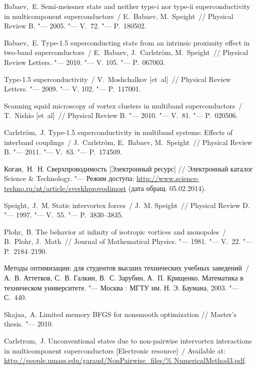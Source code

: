 \begin{thebibliography}{10}
     Babaev,~E. Semi-meissner state and neither type-i nor 
        type-ii superconductivity in multicomponent superconductors~/ 
        E.~Babaev, M.~Speight~// Physical Review B. "--- 2005. "---
        V.~72. "--- P.~180502.

     Babaev,~E. Type-1.5 superconducting state from an 
        intrinsic proximity effect in two-band superconductors~/ 
        E.~Babaev, J.~Carlstr\"om, M.~Speight~// Physical Review Letters. "---
        2010. "--- V. 105. "--- P.~067003.

     Type-1.5 superconductivity~/ V.~Moshchalkov [et~al]~// 
        Physical Review Letters. "--- 2009. "--- V. 102. "--- P.~117001.

     Scanning squid microscopy of vortex clusters in multiband 
        superconductors~/ T.~Nishio [et~al]~// Physical Review B. "---
        2010. "--- V.~81. "--- P.~020506.

     Carlstr\"om,~J. Type-1.5 superconductivity in multiband 
        systems: Effects of interband couplings~/ J.~Carlstr\"om, E.~Babaev, 
        M.~Speight~// Physical Review B. "--- 2011. "--- V.~83. "--- 
        P.~174509.

     Коган,~Н.~Н. Сверхпроводимость 
        [Электронный ресурс] // Электронный каталог Science \& Technology. "---
        Режим доступа: 
        \url{http://www.science-techno.ru/nt/article/sverkhprovodimost} 
        (дата обращ. 05.02.2014).

     Speight,~J.~M. Static intervortex forces~/ 
        J.~M. Speight~// Physical Review D. "--- 1997. "--- V.~55. "--- 
        P.~3830--3835.

     Plohr,~B. The behavior at infinity of isotropic vortices 
        and monopoles~/ B.~Plohr, J.~Math~// 
        Journal of Mathematical Physics. "--- 1981. "--- V.~22. "--- 
        P.~2184--2190.

     Методы оптимизации: для студентов высших технических 
        учебных заведений~/ А.~В. Аттетков, С.~В. Галкин, В.~С. Зарубин, 
        А.~П. Крищенко. Математика в техническом университете. "--- 
        Москва : МГТУ им. Н. Э. Баумана, 2003. "--- С.~440.

     Skajaa,~A. Limited memory BFGS for nonsmooth 
        optimization // Master's thesis. "--- 2010.

     Carlstrom,~J. Unconventional states due to 
        non-pairwise intervortex interactions in multicomponent 
        superconductors [Electronic resource]~/ Available at: 
        \url{http://people.umass.edu/garaud/NonPairwise_files/%
            NumericalMethod3.pdf}.
\end{thebibliography}

\newpage